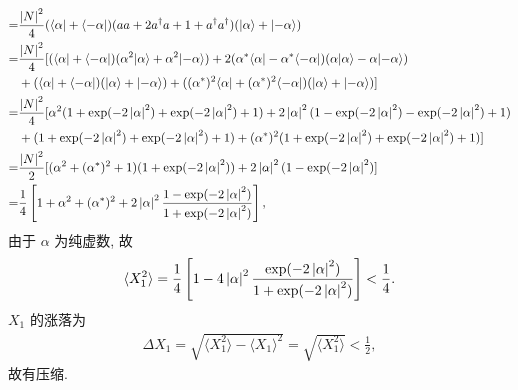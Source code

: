 \documentclass{assignment}
\begin{document}
\begin{sol}
\begin{itemize}
\begin{align}
            \notag=&\frac{\left\lvert N\right\rvert^2}{4}(\langle\alpha\rvert+\langle-\alpha\rvert)(aa+2a^{\dagger}a+1+a^{\dagger}a^{\dagger})(\lvert\alpha\rangle+\lvert-\alpha\rangle)\\
            \notag=&\frac{\left\lvert N\right\rvert^2}{4}[(\langle\alpha\rvert+\langle-\alpha\rvert)(\alpha^2\lvert\alpha\rangle+\alpha^2\lvert-\alpha\rangle)+2(\alpha^*\langle\alpha\rvert-\alpha^*\langle-\alpha\rvert)(\alpha\lvert\alpha\rangle-\alpha\lvert-\alpha\rangle)\\
            \notag&+(\langle\alpha\rvert+\langle-\alpha\rvert)(\lvert\alpha\rangle+\lvert-\alpha\rangle)+((\alpha^*)^2\langle\alpha\rvert+(\alpha^*)^2\langle-\alpha\rvert)(\lvert\alpha\rangle+\lvert-\alpha\rangle)]\\
            \notag=&\frac{\left\lvert N\right\rvert^2}{4}[\alpha^2(1+\exp(-2\left\lvert\alpha\right\rvert^2)+\exp(-2\left\lvert\alpha\right\rvert^2)+1)+2\left\lvert\alpha\right\rvert^2(1-\exp(-2\left\lvert\alpha\right\rvert^2)-\exp(-2\left\lvert\alpha\right\rvert^2)+1)\\
            \notag&+(1+\exp(-2\left\lvert\alpha\right\rvert^2)+\exp(-2\left\lvert\alpha\right\rvert^2)+1)+(\alpha^*)^2(1+\exp(-2\left\lvert\alpha\right\rvert^2)+\exp(-2\left\lvert\alpha\right\rvert^2)+1)]\\
            \notag=&\frac{\left\lvert N\right\rvert^2}{2}[(\alpha^2+(\alpha^*)^2+1)(1+\exp(-2\left\lvert\alpha\right\rvert^2))+2\left\lvert\alpha\right\rvert^2(1-\exp(-2\left\lvert\alpha\right\rvert^2)]\\
            =&\frac{1}{4}\left[1+\alpha^2+(\alpha^*)^2+2\left\lvert\alpha\right\rvert^2\frac{1-\exp(-2\left\lvert\alpha\right\rvert^2)}{1+\exp(-2\left\lvert\alpha\right\rvert^2)}\right],
        \end{align}
        由于 $\alpha$ 为纯虚数, 故
        \begin{align}
            \langle X_1^2\rangle=\frac{1}{4}\left[1-4\left\lvert\alpha\right\rvert^2\frac{\exp(-2\left\lvert\alpha\right\rvert^2)}{1+\exp(-2\left\lvert\alpha\right\rvert^2)}\right]<\frac{1}{4}.
        \end{align}
        $X_1$ 的涨落为
        \begin{align}
            \Delta X_1=\sqrt{\langle X_1^2\rangle-\langle X_1\rangle^2}=\sqrt{\langle X_1^2\rangle}<\frac{1}{2},
        \end{align}
        故有压缩.
    \end{itemize}
\end{sol}
\end{document}
